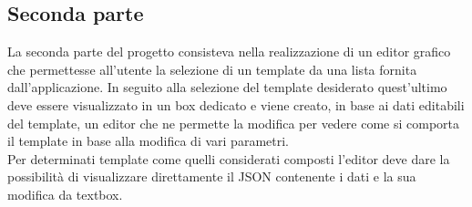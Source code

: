 \subsection{Seconda parte}
La seconda parte del progetto consisteva nella realizzazione di un editor grafico che permettesse all'utente la selezione di un template da una lista fornita dall'applicazione.
In seguito alla selezione del template desiderato quest'ultimo deve essere visualizzato in un box dedicato e viene creato, in base ai dati editabili del template, un editor che ne permette la modifica per vedere come si comporta il template in base alla modifica di vari parametri.	\\
Per determinati template come quelli considerati composti l'editor deve dare la possibilità di visualizzare direttamente il JSON contenente i dati e la sua modifica da textbox.\\ 

